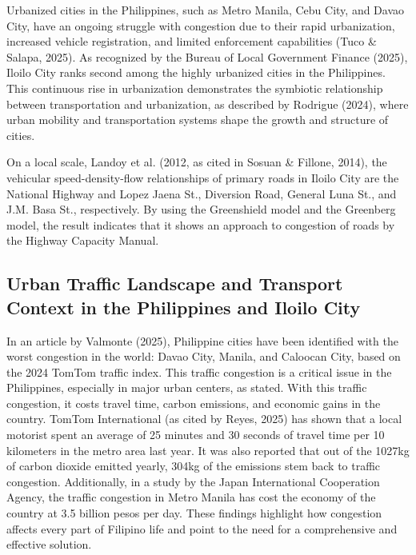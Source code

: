 Urbanized cities in the Philippines, such as Metro Manila, Cebu City, and Davao City, have an ongoing struggle with congestion due to their rapid urbanization, increased vehicle registration, and limited enforcement capabilities (Tuco \& Salapa, 2025). As recognized by the Bureau of Local Government Finance (2025), Iloilo City ranks second among the highly urbanized cities in the Philippines. This continuous rise in urbanization demonstrates the symbiotic relationship between transportation and urbanization, as described by Rodrigue (2024), where urban mobility and transportation systems shape the growth and structure of cities.

On a local scale, Landoy et al. (2012, as cited in Sosuan \& Fillone, 2014), the vehicular speed-density-flow relationships of primary roads in Iloilo City are the National Highway and Lopez Jaena St., Diversion Road, General Luna St., and J.M. Basa St., respectively. By using the Greenshield model and the Greenberg model, the result indicates that it shows an approach to congestion of roads by the Highway Capacity Manual.

\subsection{Urban Traffic Landscape and Transport Context in the Philippines and Iloilo City}
\label{sec:traffic_landscape}

In an article by Valmonte (2025), Philippine cities have been identified with the worst congestion in the world: Davao City, Manila, and Caloocan City, based on the 2024 TomTom traffic index. This traffic congestion is a critical issue in the Philippines, especially in major urban centers, as stated. With this traffic congestion, it costs travel time, carbon emissions, and economic gains in the country. TomTom International (as cited by Reyes, 2025) has shown that a local motorist spent an average of 25 minutes and 30 seconds of travel time per 10 kilometers in the metro area last year. It was also reported that out of the 1027kg of carbon dioxide emitted yearly, 304kg of the emissions stem back to traffic congestion. Additionally, in a study by the Japan International Cooperation Agency, the traffic congestion in Metro Manila has cost the economy of the country at 3.5 billion pesos per day. These findings highlight how congestion affects every part of Filipino life and point to the need for a comprehensive and effective solution.

